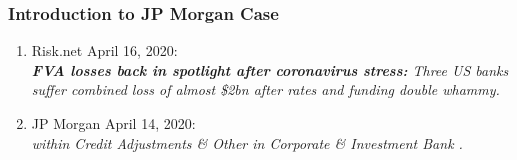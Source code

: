 \documentclass[main.tex]{subfiles}
\begin{document}
    \begin{frame}
        \frametitle{Introduction to JP Morgan Case}

        \begin{enumerate}
            \item Risk.net April 16, 2020: \\
            \textit{%
                \textbf{FVA losses back in spotlight after coronavirus stress:} 
                Three US banks suffer combined loss of almost 
                \$2bn after rates and funding double whammy.
            }
            \item JP Morgan April 14, 2020: \\
            \textit{%
                \underline{} 
                within Credit Adjustments \& Other in Corporate \& Investment Bank 
                \underline{}.
            }
        \end{enumerate}

        \begin{center}
            \resizebox{.85\textwidth}{!}{%
                
            }
        \end{center}
    \end{frame}
\end{document}
